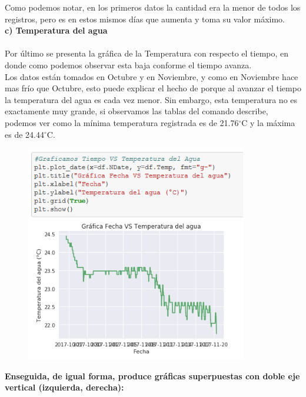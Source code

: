 \documentclass[12pt]{article}
\begin{document}
Como podemos notar, en los primeros datos la cantidad era la menor de todos los registros, pero es en estos mismos días que aumenta y toma su valor máximo. \\

\noindent\textbf {c) Temperatura del agua} \\ \\
Por último se presenta la gráfica de la Temperatura con respecto el tiempo, en donde como podemos observar esta baja conforme el tiempo avanza. \\

Los datos están tomados en Octubre y en Noviembre, y como en Noviembre hace mas frío que Octubre, esto puede explicar el hecho de porque al avanzar el tiempo la temperatura del agua es cada vez menor. Sin embargo, esta temperatura no es exactamente muy grande, si observamos las tablas del comando describe, podemos ver como la mínima temperatura registrada es de 21.76$^{\circ}$C y la máxima es de 24.44$^{\circ}$C. \\

\begin{figure}[h!]
    \centering
\includegraphics[width=3.8in]{GrafF3.png}
\end{figure}

\noindent\textbf {Enseguida, de igual forma, produce gráficas superpuestas con doble eje vertical (izquierda, derecha):} \\
\end{document}
